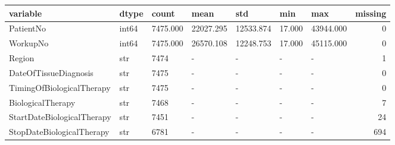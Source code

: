 \begin{tabular}{lllllllr}
\toprule
variable & dtype & count & mean & std & min & max & missing \\
\midrule
PatientNo & int64 & 7475.000 & 22027.295 & 12533.874 & 17.000 & 43944.000 & 0 \\
WorkupNo & int64 & 7475.000 & 26570.108 & 12248.753 & 17.000 & 45115.000 & 0 \\
Region & str & 7474 & - & - & - & - & 1 \\
DateOfTissueDiagnosis & str & 7475 & - & - & - & - & 0 \\
TimingOfBiologicalTherapy & str & 7475 & - & - & - & - & 0 \\
BiologicalTherapy & str & 7468 & - & - & - & - & 7 \\
StartDateBiologicalTherapy & str & 7451 & - & - & - & - & 24 \\
StopDateBiologicalTherapy & str & 6781 & - & - & - & - & 694 \\
\bottomrule
\end{tabular}

